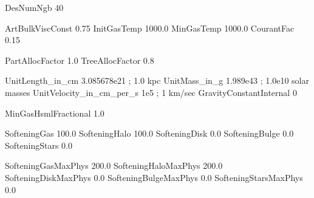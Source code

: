 
DesNumNgb           40

ArtBulkViscConst    0.75
InitGasTemp         1000.0  %
MinGasTemp          1000.0    
CourantFac          0.15



PartAllocFactor       1.0
TreeAllocFactor       0.8




UnitLength_in_cm         3.085678e21        ;  1.0 kpc
UnitMass_in_g            1.989e43           ;  1.0e10 solar masses
UnitVelocity_in_cm_per_s 1e5                ;  1 km/sec
GravityConstantInternal  0



MinGasHsmlFractional     1.0  %

SofteningGas       100.0
SofteningHalo      100.0
SofteningDisk      0.0
SofteningBulge     0.0           
SofteningStars     0.0

SofteningGasMaxPhys       200.0
SofteningHaloMaxPhys      200.0
SofteningDiskMaxPhys      0.0
SofteningBulgeMaxPhys     0.0           
SofteningStarsMaxPhys     0.0












